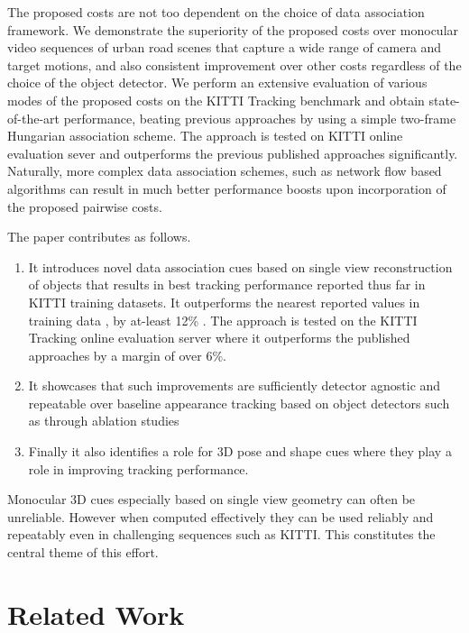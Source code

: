 \documentclass[letterpaper, 10 pt, conference]{ieeeconf}
\begin{document}
The proposed costs are not too dependent on the choice of data association framework. We demonstrate the superiority of the proposed costs over monocular video sequences of urban road scenes that capture a wide range of camera and target motions, and also consistent improvement over other costs regardless of the choice of the object detector. We perform an extensive evaluation of various modes of the proposed costs on the KITTI Tracking benchmark \cite{KITTI} and obtain state-of-the-art performance, beating previous approaches by using a simple two-frame Hungarian association scheme. The approach is tested on KITTI online evaluation sever and outperforms the previous published approaches significantly. Naturally, more complex data association schemes, such as network flow based algorithms \cite{NetFlow2008,DiscreteContinuous,gmmcp,followme} can result in much better performance boosts upon incorporation of the proposed pairwise costs.

The paper contributes as follows.
\begin{enumerate}
\item It introduces novel data association cues based on single view reconstruction of objects that results in best tracking performance reported thus far in KITTI training datasets. It outperforms the nearest reported values in training data \cite{choi2013,DeepNetworkFlow,NOMT}, by at-least 12\% . The approach is tested on the KITTI Tracking online evaluation server where it outperforms the published approaches by a margin of over $6\%$.

\item It showcases that such improvements are sufficiently detector agnostic and repeatable over baseline appearance tracking based on object detectors such as \cite{RRC,SubCNN} through ablation studies

\item Finally it also identifies a role for 3D pose and shape cues where they play a role in improving tracking performance. 

\end{enumerate}

Monocular 3D cues especially based on single view geometry can often be unreliable. However when computed effectively they can be used reliably and repeatably even in challenging sequences such as KITTI. This constitutes the central theme of this effort.


\section{Related Work}
\end{document}
